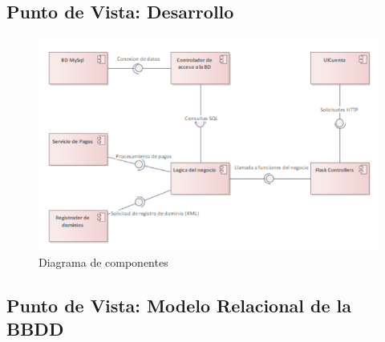 \subsection{Punto de Vista: Desarrollo}
\begin{figure}[H]
	\includegraphics[width=\columnwidth]{puntovista/diacomponentes.png}
	\caption{Diagrama de componentes}
	\label{fig:diacomponentes}
\end{figure}

\subsection{Punto de Vista: Modelo Relacional de la BBDD}
